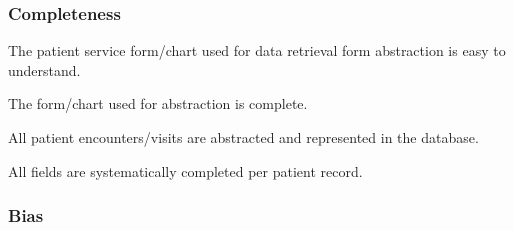 \subsubsection{Completeness}

\begin{QandA}
    \item The patient service form/chart used for data retrieval form abstraction is easy to understand.
    \begin{answered}
        
    \end{answered}

    \item The form/chart used for abstraction is complete.
    \begin{answered}
        
    \end{answered}

    \item All patient encounters/visits are abstracted and represented in the database.
    \begin{answered}
        
    \end{answered}

    \item All fields are systematically completed per patient record.
    \begin{answered}
        
    \end{answered}

\end{QandA}

\subsubsection{Bias}

